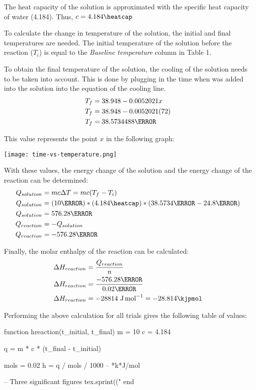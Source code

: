\documentclass[demo, 12pt, notitlepage, letterpaper]{report}
\begin{document}
The heat capacity of the solution is approximated with the specific heat capacity of water (4.184\heatcap). Thus, $c = 4.184\heatcap$

To calculate the change in temperature of the solution, the initial and final temperatures are needed. The initial temperature of the solution before the reaction ($T_i$) is equal to the \textit{Baseline temperature} column in Table 1.

To obtain the final temperature of the solution, the cooling of the solution needs to be taken into account. This is done by plugging in the time when  was added into the solution into the equation of the cooling line.
\begin{align*}
	T_f & = 38.948 - 0.0052021x    \\
	T_f & = 38.948 - 0.0052021(72) \\
	T_f & = 38.5734488\celsius
\end{align*}

This value represents the point $x$ in the following graph:

\centerline{\noindent\texttt{[image: time-vs-temperature.png]}}


With these values, the energy change of the solution and the energy change of the reaction can be determined:
\begin{align*}
	Q_{solution} & = mc\Delta T = mc(T_f - T_i)
	\\
	Q_{solution} & = (10\gram) * (4.184\heatcap) * (38.5734\celsius - 24.8\celsius)
	\\
	Q_{solution} & = 576.28\joule
	\\
	Q_{reaction} & = -Q_{solution}
	\\
	Q_{reaction} & = -576.28\joule
\end{align*}

Finally, the molar enthalpy of the reaction can be calculated:
\begin{align*}
	\Delta H_{reaction} & = \frac{Q_{reaction}}{n}                        \\
	\Delta H_{reaction} & = \frac{-576.28\joule}{0.02\mol}                \\
	\Delta H_{reaction} & = -28814~\unit{\joule\per\mol} = -28.814\kjpmol
\end{align*}

Performing the above calculation for all trials gives the following table of values:

\begin{luacode*}
function hreaction(t_initial, t_final)
	m = 10
	c = 4.184

	q = m * c * (t_final - t_initial)

	mols = 0.02
	h = q / mols / 1000 -- *k*J/mol

	-- Three significant figures
	tex.sprint(("%
end
\end{luacode*}
\end{document}
